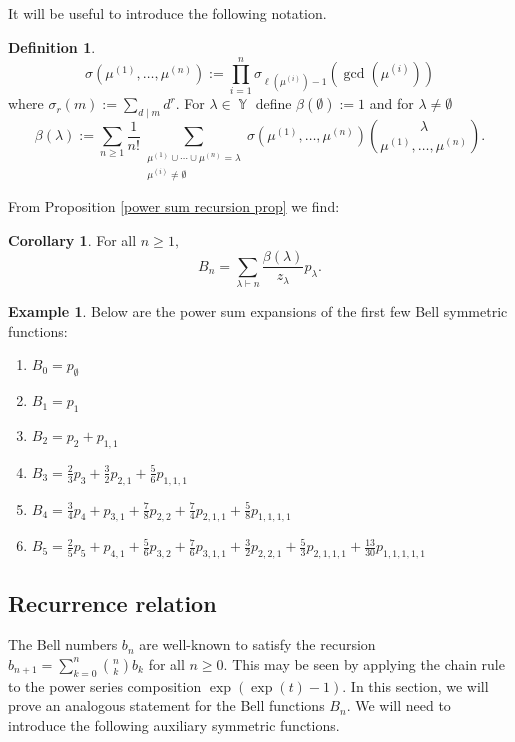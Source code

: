 \documentclass[12pt,reqno]{amsart}
\theoremstyle{definition}
\newtheorem{cor}[thm]{Corollary}
\newtheorem{defn}[thm]{Definition}
\newtheorem{example}{Example}
\DeclareMathOperator{\Par}{\mathbb{Y}}
\begin{document}
It will be useful to introduce the following notation.

\begin{defn}
$$\sigma(\mu^{(1)},\ldots , \mu^{(n)}):= \prod_{i =1}^{n} \sigma_{\ell(\mu^{(i)})-1}(\gcd(\mu^{(i)}))$$ where
    $\sigma_r(m):= \sum_{d\mid m} d^r.$
    For $\lambda \in \Par$ define $\beta(\emptyset):= 1$ and for $\lambda \neq \emptyset$
    $$\beta(\lambda):= \sum_{n \geq 1} \frac{1}{n!} \sum_{\substack{\mu^{(1)}\cup\cdots\cup \mu^{(n)} = \lambda  
 \\ \mu^{(i)} \neq \emptyset}} \sigma(\mu^{(1)},\ldots,\mu^{(n)})\binom{\lambda}{\mu^{(1)},\ldots,\mu^{(n)}}.$$
\end{defn}

From Proposition \ref{power sum recursion prop} we find:

\begin{cor}
For all $n \geq 1,$
    $$B_n = \sum_{\lambda \vdash n} \frac{\beta(\lambda)}{z_{\lambda}} p_{\lambda}.$$
\end{cor}

\begin{example}
    Below are the power sum expansions of the first few Bell symmetric functions:
    \begin{enumerate}
        \item $B_0 = p_{\emptyset}$
        \item $B_1 = p_{1}$
        \item $B_2 = p_2 + p_{1,1}$
        \item $B_3 = \frac{2}{3} p_3 + \frac{3}{2} p_{2,1} + \frac{5}{6} p_{1,1,1}$
        \item $B_4 = \frac{3}{4}p_4 + p_{3,1} + \frac{7}{8} p_{2,2} + \frac{7}{4} p_{2,1,1} + \frac{5}{8} p_{1,1,1,1} $
        \item $B_5 = \frac{2}{5} p_5 + p_{4,1} + \frac{5}{6} p_{3,2}+\frac{7}{6} p_{3,1,1} + \frac{3}{2}p_{2,2,1} + \frac{5}{3}p_{2,1,1,1}+\frac{13}{30} p_{1,1,1,1,1}$
    \end{enumerate}
\end{example}

\subsection{Recurrence relation}

The Bell numbers $b_n$ are well-known to satisfy the recursion
$b_{n+1} = \sum_{k=0}^{n} \binom{n}{k} b_k$ for all $n \geq 0.$ This may be seen by applying the chain rule to the power series composition $\exp( \exp(t)-1).$ In this section, we will prove an analogous statement for the Bell functions $B_n.$ We will need to introduce the following auxiliary symmetric functions.
\end{document}
